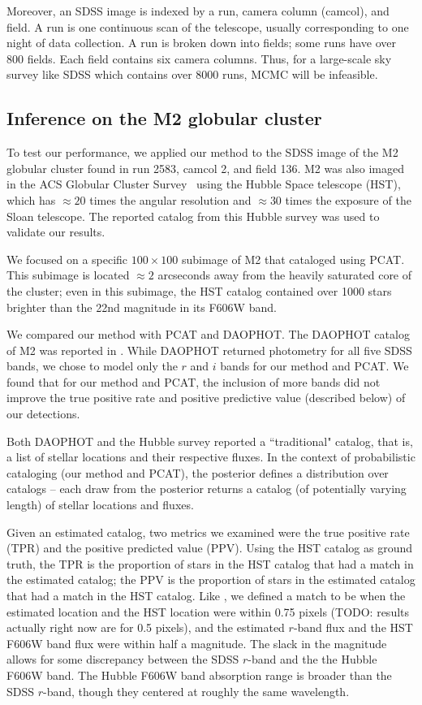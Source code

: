 Moreover, an SDSS image is indexed by a run, camera column (camcol), and field.
A run is one continuous scan of the telescope, usually corresponding to one night of data collection. 
A run is broken down into fields; some runs have over 800 fields. 
Each field contains six camera columns. 
Thus, for a large-scale sky survey like SDSS which 
contains over 8000 runs, MCMC will be infeasible. 


\subsection{Inference on the M2 globular cluster}
To test our performance, we applied our method to the SDSS image of the M2 globular cluster found in run 2583, camcol 2, and field 136.
M2 was also imaged in the ACS Globular Cluster Survey~\cite{Sarajedini_2007}
using the Hubble Space telescope (HST),
which has $\approx20$ times the angular resolution and $\approx30$ times the exposure of the Sloan telescope. The reported catalog from this Hubble survey was used to 
validate our results.

We focused on a specific $100 \times 100$ subimage of M2 that \cite{Portillo_2017, Feder_2019} cataloged using PCAT.
This subimage is located $\approx2$ arcseconds away from the heavily saturated core of the cluster;
even in this subimage, the HST catalog contained over 1000 stars brighter than the 22nd magnitude in its F606W band.

We compared our method with PCAT and DAOPHOT. The DAOPHOT catalog of M2 was reported in 
\cite{An_2008_m2}. While DAOPHOT returned photometry for all five SDSS bands, 
we chose to model only the $r$ and $i$ bands for our method and PCAT. We found 
that for our method and PCAT, the inclusion of more bands did not improve
the true positive rate and positive predictive value (described below) of our detections. 

Both DAOPHOT and the Hubble survey reported a ``traditional" catalog, that is, a list of stellar locations and their respective fluxes. In the context of probabilistic cataloging (our method and PCAT), the posterior 
defines a distribution over catalogs -- each draw from the posterior returns a catalog 
(of potentially varying length) of stellar locations and fluxes. 

Given an estimated catalog, two metrics we examined were the true positive rate (TPR) and the positive predicted value (PPV). Using the HST catalog as ground truth, the TPR is the proportion of stars in the HST catalog that had a match in the estimated catalog;
the PPV is the proportion of stars in the estimated catalog that had a match in the HST catalog. Like \cite{Portillo_2017, Feder_2019}, we defined a match to be when the estimated location and the HST location were within 0.75 pixels
(TODO: results actually right now are for 0.5 pixels),
and the estimated $r$-band flux and the HST F606W band flux were within half a
magnitude. The slack in the magnitude allows for some discrepancy between the 
SDSS $r$-band and the the Hubble F606W band. The Hubble F606W band absorption range is broader than the SDSS $r$-band, though they centered at roughly the same wavelength. 

